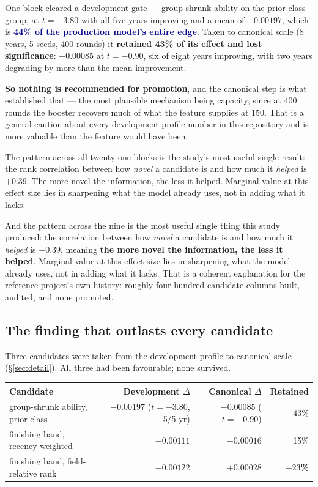 \documentclass[11pt,a4paper]{article}
\newcommand{\good}[1]{\textcolor{darkblue}{\textbf{#1}}}
\newcommand{\bad}[1]{\textcolor{warm}{\textbf{#1}}}
\begin{document}
One block cleared a development gate --- group-shrunk ability on the prior-class
group, at $t=-3.80$ with all five years improving and a mean of $-0.00197$, which
is \good{44\% of the production model's entire edge}. Taken to canonical scale
(8 years, 5 seeds, 400 rounds) it \bad{retained 43\% of its effect and lost
significance}: $-0.00085$ at $t=-0.90$, six of eight years improving, with two
years degrading by more than the mean improvement.

\textbf{So nothing is recommended for promotion}, and the canonical step is what
established that --- the most plausible mechanism being capacity, since at 400
rounds the booster recovers much of what the feature supplies at 150. That is a
general caution about every development-profile number in this repository and is
more valuable than the feature would have been.

The pattern across all twenty-one blocks is the study's most useful single result:
the rank correlation between how \emph{novel} a candidate is and how much it
\emph{helped} is $+0.39$. The more novel the information, the less it helped.
Marginal value at this effect size lies in sharpening what the model already uses,
not in adding what it lacks.

And the pattern across the nine is the most useful single thing this study
produced: the correlation between how \emph{novel} a candidate is and how much it
\emph{helped} is $+0.39$, meaning \textbf{the more novel the information, the less
it helped}. Marginal value at this effect size lies in sharpening what the model
already uses, not in adding what it lacks. That is a coherent explanation for the
reference project's own history: roughly four hundred candidate columns built,
audited, and none promoted.

\subsection*{The finding that outlasts every candidate}

Three candidates were taken from the development profile to canonical scale
(\S\ref{sec:detail}). All three had been favourable; none survived.

\begin{center}\small
\begin{tabular}{lrrr}
\toprule
Candidate & Development $\Delta$ & Canonical $\Delta$ & Retained\\
\midrule
group-shrunk ability, prior class & $-0.00197$ ($t=-3.80$, 5/5 yr) & $-0.00085$ ($t=-0.90$) & 43\%\\
finishing band, recency-weighted & $-0.00111$ & $-0.00016$ & 15\%\\
finishing band, field-relative rank & $-0.00122$ & $+0.00028$ & \bad{$-23$\%}\\
\bottomrule
\end{tabular}
\end{center}
\end{document}

